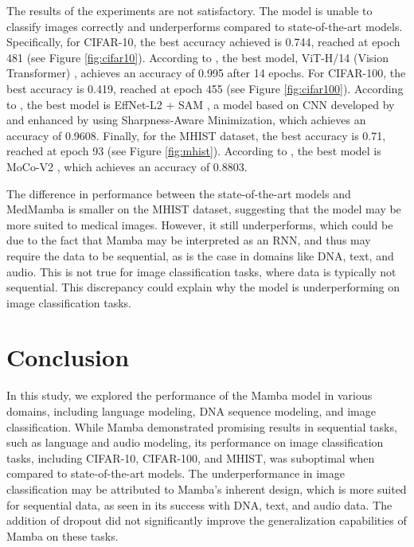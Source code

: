\documentclass[onecolumn]{IEEEtran}
\begin{document}
The results of the experiments are not satisfactory. The model is unable to classify images correctly and underperforms compared to state-of-the-art models. Specifically, for CIFAR-10, the best accuracy achieved is 0.744, reached at epoch 481 (see Figure \ref{fig:cifar10}). According to \cite{paperswithcodePapersWithCifar10}, the best model, ViT-H/14 (Vision Transformer) \cite{dosovitskiy2020image}, achieves an accuracy of 0.995 after 14 epochs. For CIFAR-100, the best accuracy is 0.419, reached at epoch 455 (see Figure \ref{fig:cifar100}). According to \cite{paperswithcodePapersWithCifar100}, the best model is EffNet-L2 + SAM \cite{foret2020sharpness}, a model based on CNN developed by \cite{tan2019efficientnet} and enhanced by \cite{dosovitskiy2020image} using Sharpness-Aware Minimization, which achieves an accuracy of 0.9608. Finally, for the MHIST dataset, the best accuracy is 0.71, reached at epoch 93 (see Figure \ref{fig:mhist}). According to \cite{paperswithcodePapersWithMHIST}, the best model is MoCo-V2 \cite{foret2020sharpness}, which achieves an accuracy of 0.8803.

The difference in performance between the state-of-the-art models and MedMamba is smaller on the MHIST dataset, suggesting that the model may be more suited to medical images. However, it still underperforms, which could be due to the fact that Mamba may be interpreted as an RNN, and thus may require the data to be sequential, as is the case in domains like DNA, text, and audio. This is not true for image classification tasks, where data is typically not sequential. This discrepancy could explain why the model is underperforming on image classification tasks.

\section{Conclusion}
In this study, we explored the performance of the Mamba model in various domains, including language modeling, DNA sequence modeling, and image classification. While Mamba demonstrated promising results in sequential tasks, such as language and audio modeling, its performance on image classification tasks, including CIFAR-10, CIFAR-100, and MHIST, was suboptimal when compared to state-of-the-art models. The underperformance in image classification may be attributed to Mamba's inherent design, which is more suited for sequential data, as seen in its success with DNA, text, and audio data. The addition of dropout did not significantly improve the generalization capabilities of Mamba on these tasks.
\end{document}
